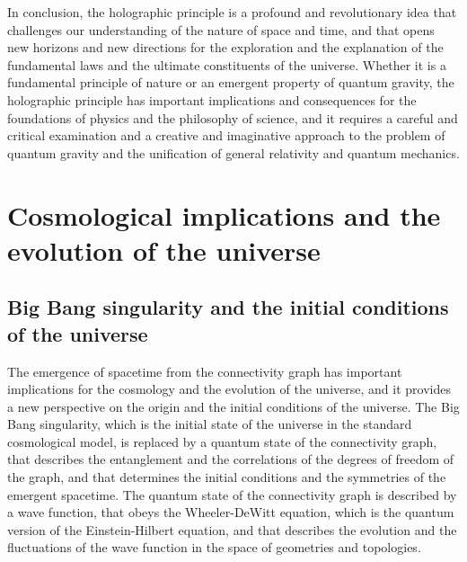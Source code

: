 \begin{tcolorbox}[colback=green!5!white,colframe=green!75!black,title=Question]
In conclusion, the holographic principle is a profound and revolutionary idea that challenges our understanding of the nature of space and time, and that opens new horizons and new directions for the exploration and the explanation of the fundamental laws and the ultimate constituents of the universe. Whether it is a fundamental principle of nature or an emergent property of quantum gravity, the holographic principle has important implications and consequences for the foundations of physics and the philosophy of science, and it requires a careful and critical examination and a creative and imaginative approach to the problem of quantum gravity and the unification of general relativity and quantum mechanics.
\end{tcolorbox}

\section{Cosmological implications and the evolution of the universe}
\subsection{Big Bang singularity and the initial conditions of the universe}
The emergence of spacetime from the connectivity graph has important implications for the cosmology and the evolution of the universe, and it provides a new perspective on the origin and the initial conditions of the universe. The Big Bang singularity, which is the initial state of the universe in the standard cosmological model, is replaced by a quantum state of the connectivity graph, that describes the entanglement and the correlations of the degrees of freedom of the graph, and that determines the initial conditions and the symmetries of the emergent spacetime. The quantum state of the connectivity graph is described by a wave function, that obeys the Wheeler-DeWitt equation, which is the quantum version of the Einstein-Hilbert equation, and that describes the evolution and the fluctuations of the wave function in the space of geometries and topologies.

